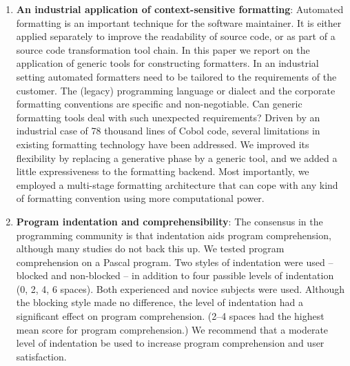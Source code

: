 \begin{englishtext}
\begin{enumerate}
    \item \textbf{An industrial application of context-sensitive formatting}: Automated
    formatting is an important technique for the software maintainer. It is
    either applied separately to improve the readability of source code, or as
    part of a source code transformation tool chain. In this paper we report on
    the application of generic tools for constructing formatters. In an
    industrial setting automated formatters need to be tailored to the
    requirements of the customer. The (legacy) programming language or dialect
    and the corporate formatting conventions are specific and non-negotiable.
    Can generic formatting tools deal with such unexpected requirements? Driven
    by an industrial case of 78 thousand lines of Cobol code, several
    limitations in existing formatting technology have been addressed. We
    improved its flexibility by replacing a generative phase by a generic tool,
    and we added a little expressiveness to the formatting backend. Most
    importantly, we employed a multi-stage formatting architecture that can cope
    with any kind of formatting convention using more computational power.
    \cite{industrialApplication}

    \item \textbf{Program indentation and comprehensibility}: The consensus in the
    programming community is that indentation aids program comprehension,
    although many studies do not back this up. We tested program comprehension
    on a Pascal program. Two styles of indentation were used -- blocked and
    non-blocked -- in addition to four passible levels of indentation
    (0, 2, 4, 6 spaces). Both experienced and novice subjects were used.
    Although the blocking style made no difference, the level of indentation had
    a significant effect on program comprehension. (2--4 spaces had the highest
    mean score for program comprehension.) We recommend that a moderate level
    of indentation be used to increase program comprehension and user
    satisfaction. \cite{programIndentation}


\end{enumerate}
\end{englishtext}
